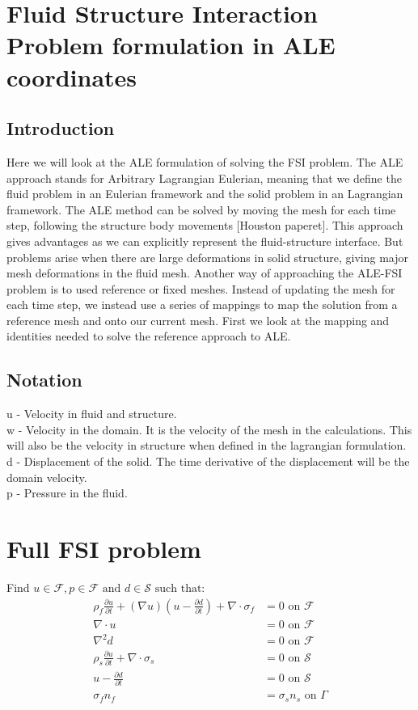 

\section*{Fluid Structure Interaction Problem formulation in ALE coordinates}
\subsection*{Introduction}
Here we will look at the ALE formulation of solving the FSI problem. The ALE approach stands for Arbitrary Lagrangian Eulerian, meaning that we define the fluid problem in an Eulerian framework and the solid problem in an Lagrangian framework. The ALE method can be solved by moving the mesh for each time step, following the structure body movements [Houston paperet]. This approach gives advantages as we can explicitly represent the fluid-structure interface. But problems arise when there are large deformations in solid structure, giving major mesh deformations in the fluid mesh. Another way of approaching the ALE-FSI problem is to used reference or fixed meshes. Instead of updating the mesh for each time step, we instead use a series of mappings to map the solution from a reference mesh and onto our current mesh. First we look at the mapping and identities needed to solve the reference approach to ALE.
\subsection*{Notation}
u - Velocity in fluid and structure. \\
w - Velocity in the domain. It is the velocity of the mesh in the calculations. This will also be the velocity in structure when defined in the lagrangian formulation. \\
d - Displacement of the solid. The time derivative of the displacement will be the domain velocity. \\
p - Pressure in the fluid. 

\section*{Full FSI problem}
Find $u \in \mathcal{F} , p \in \mathcal{F} \text{  and  } d \in \mathcal{S} \text{  such that}:$ 
\begin{align}
\rho_f  \frac{\partial u}{\partial t} + (\nabla u)(u-\frac{\partial d}{\partial t})  + \nabla \cdot \sigma_f  &= 0 \text{  on  } \mathcal{F } \\
\nabla \cdot u  &= 0 \text{  on  } \mathcal{F}   \\
\nabla^2 d &= 0  \text{  on  } \mathcal{F}\\
\rho_s \frac{\partial u}{\partial t} + \nabla \cdot \sigma_s &=0  \text{  on  } \mathcal{ S }\\
u- \frac{\partial d}{\partial t}  &= 0  \text{  on  } \mathcal{ S }\\
\sigma_f  n_f &= \sigma_s  n_s \text{  on  } \Gamma
\end{align}





